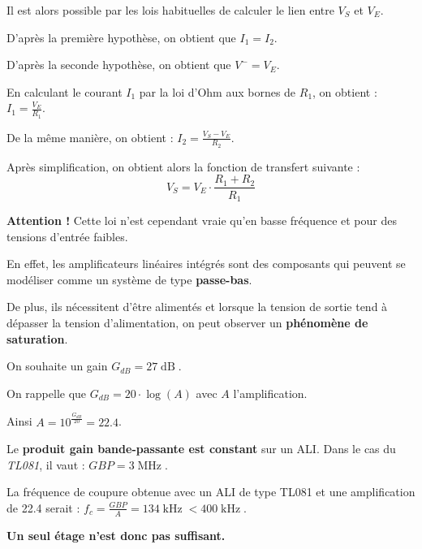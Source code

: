 \documentclass[a4paper,french]{paper}
\begin{document}
\medskip

Il est alors possible par les lois habituelles de calculer le lien entre $V_S$ et $V_E$.

D'après la première hypothèse, on obtient que $I_1 = I_2$.

D'après la seconde hypothèse, on obtient que $V^- = V_E$.

En calculant le courant $I_1$ par la loi d'Ohm aux bornes de $R_1$, on obtient : $I_1 = \frac{V_E}{R_1}$.

De la même manière, on obtient : $I_2 = \frac{V_S - V_E}{R_2}$.

Après simplification, on obtient alors la fonction de transfert suivante : $$\boxed{V_S = V_E \cdot \frac{R_1 + R_2}{R_1}}$$


\noindent\hrulefill

\textbf{Attention !} Cette loi n'est cependant vraie qu'en basse fréquence et pour des tensions d'entrée faibles.

En effet, les amplificateurs linéaires intégrés sont des composants qui peuvent se modéliser comme un système de type \textbf{passe-bas}.

De plus, ils nécessitent d'être alimentés et lorsque la tension de sortie tend à dépasser la tension d'alimentation, on peut observer un \textbf{phénomène de saturation}.




On souhaite un gain $G_{dB} = 27\operatorname{dB}$.

On rappelle que $G_{dB} = 20 \cdot \log (A)$ avec $A$ l'amplification.

Ainsi $A = 10^{\frac{G_{dB}}{20}} = 22.4$.

\medskip

Le \textbf{produit gain bande-passante est constant} sur un ALI. Dans le cas du \textit{TL081}, il vaut : $GBP = 3\operatorname{MHz}$.

La fréquence de coupure obtenue avec un ALI de type TL081 et une amplification de 22.4 serait : $f_c = \frac{GBP}{A} = 134\operatorname{kHz} < 400\operatorname{kHz}$. 

\textbf{Un seul étage n'est donc pas suffisant.}
\end{document}
